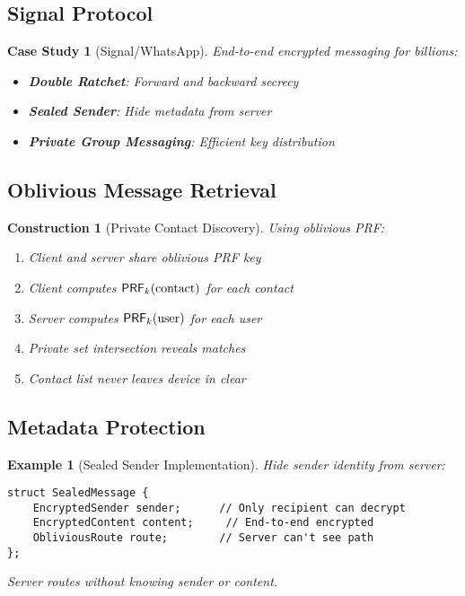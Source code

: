 \documentclass[11pt,final]{article}
\newtheorem{example}[theorem]{Example}
\newtheorem{construction}[theorem]{Construction}
\newtheorem{casestudy}[theorem]{Case Study}
\begin{document}
\subsection{Signal Protocol}

\begin{casestudy}[Signal/WhatsApp]
End-to-end encrypted messaging for billions:
\begin{itemize}
    \item \textbf{Double Ratchet}: Forward and backward secrecy
    \item \textbf{Sealed Sender}: Hide metadata from server
    \item \textbf{Private Group Messaging}: Efficient key distribution
\end{itemize}
\end{casestudy}

\subsection{Oblivious Message Retrieval}

\begin{construction}[Private Contact Discovery]
Using oblivious PRF:
\begin{enumerate}
    \item Client and server share oblivious PRF key
    \item Client computes $\mathsf{PRF}_k(\text{contact})$ for each contact
    \item Server computes $\mathsf{PRF}_k(\text{user})$ for each user
    \item Private set intersection reveals matches
    \item Contact list never leaves device in clear
\end{enumerate}
\end{construction}

\subsection{Metadata Protection}

\begin{example}[Sealed Sender Implementation]
Hide sender identity from server:
\begin{verbatim}
struct SealedMessage {
    EncryptedSender sender;      // Only recipient can decrypt
    EncryptedContent content;     // End-to-end encrypted
    ObliviousRoute route;        // Server can't see path
};
\end{verbatim}
Server routes without knowing sender or content.
\end{example}
\end{document}
